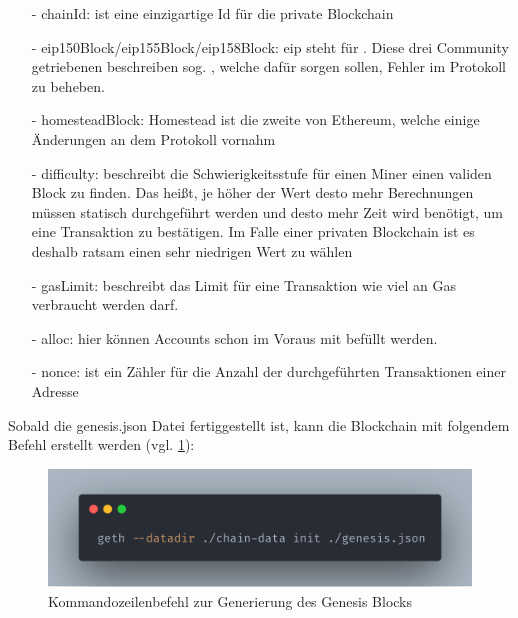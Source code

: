 \begin{itemize}
	\item[-] chainId: ist eine einzigartige Id für die private Blockchain
	      	      	      	      
	\item[-] eip150Block/eip155Block/eip158Block: eip steht für . Diese drei Community getriebenen  beschreiben sog. , welche dafür sorgen sollen, Fehler im Protokoll zu beheben. 
	      	      	      	      
	\item[-] homesteadBlock: Homestead ist die zweite  von Ethereum, welche einige Änderungen an dem Protokoll vornahm
	      	      	      	      	
	\item[-] difficulty: beschreibt die Schwierigkeitsstufe für einen Miner einen validen Block zu finden. Das heißt, je höher der Wert desto mehr Berechnungen müssen statisch durchgeführt werden und desto mehr Zeit wird benötigt, um eine Transaktion zu bestätigen. Im Falle einer privaten Blockchain ist es deshalb ratsam einen sehr niedrigen Wert zu wählen
	      	      	      	      	
	\item[-] gasLimit: beschreibt das Limit für eine Transaktion wie viel an Gas verbraucht werden darf. 
	      	      	      	      
	\item[-] alloc: hier können Accounts schon im Voraus mit  befüllt werden.
	\item[-] nonce: ist ein Zähler für die Anzahl der durchgeführten Transaktionen einer Adresse
\end{itemize}

Sobald die genesis.json Datei fertiggestellt ist, kann die Blockchain mit folgendem Befehl erstellt werden (vgl. \ref{img:gethInit}):\\
\begin{figure}[th!]
	\centering
	\includegraphics[width=.9\columnwidth]{./Abbildungen/Kapitel_03/geth-init.png}
	\caption[geth init]{Kommandozeilenbefehl zur Generierung des Genesis Blocks}
	\label{img:gethInit}
\end{figure}

